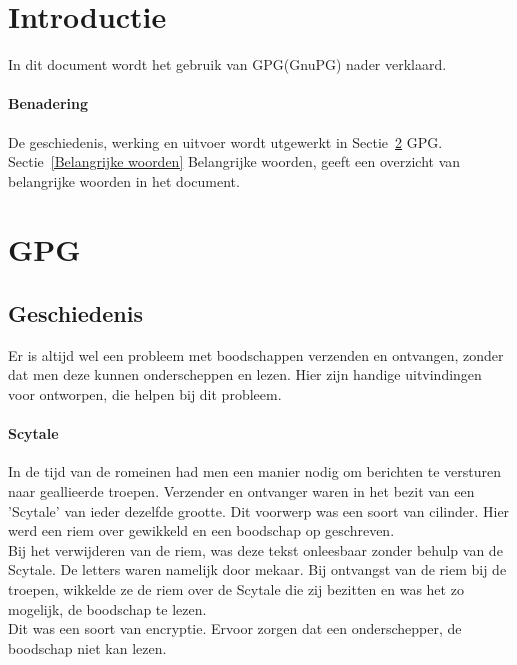 \documentclass[12pt]{article}
\begin{document}
	\maketitle

	\newpage
	\tableofcontents
	\newpage
	\listoffigures
	\listoftables

	\newpage
		\section{Introductie}
			In dit document wordt het gebruik van GPG(GnuPG) nader verklaard.

		\paragraph{Benadering}
			De geschiedenis, werking en uitvoer wordt utgewerkt in Sectie~\ref{GPG} GPG.\\
			Sectie~\ref{Belangrijke woorden} Belangrijke woorden, geeft een overzicht van belangrijke 			woorden in het document.

		\newpage
		\section{GPG}\label{GPG}
			\subsection{Geschiedenis}
				Er is altijd wel een probleem met boodschappen verzenden en ontvangen, zonder dat men 				deze kunnen onderscheppen en lezen. Hier zijn handige uitvindingen voor ontworpen, 						die helpen bij dit probleem.

			\paragraph{Scytale}
				In de tijd van de romeinen had men een manier nodig om berichten te versturen naar 						geallieerde troepen. Verzender en ontvanger waren in het bezit van een 'Scytale' van 					ieder dezelfde grootte. Dit voorwerp was een soort van cilinder. Hier werd een riem 					over gewikkeld en een boodschap op geschreven.\\
				Bij het verwijderen van de riem, was deze tekst onleesbaar zonder behulp van de 						Scytale. De letters waren namelijk door mekaar. Bij ontvangst van de riem bij de 						troepen, wikkelde ze de riem over de Scytale die zij bezitten en was het zo mogelijk, 					de boodschap te lezen.\\
				Dit was een soort van encryptie. Ervoor zorgen dat een onderschepper, de boodschap 						niet kan lezen.
\end{document}
